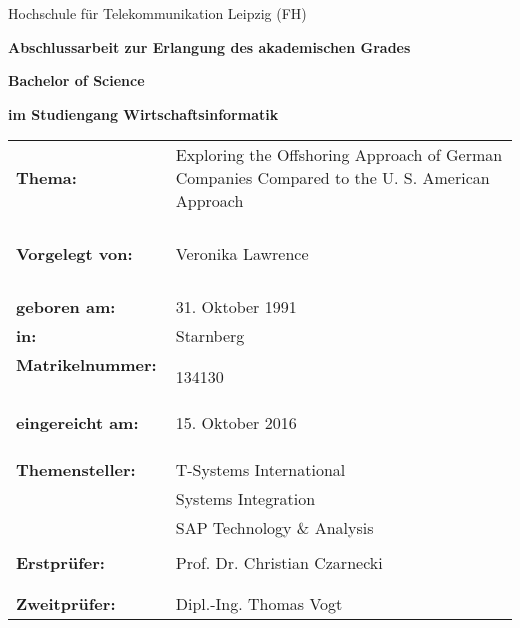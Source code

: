 
\thispagestyle{empty}
\vspace{1cm}

\begin{center}
\Large{Hochschule für Telekommunikation Leipzig (FH)}
\vspace{1.5cm}
\end{center}

\begin{center}
\large{\textbf{Abschlussarbeit zur Erlangung des akademischen Grades}}
\end{center}

\begin{center}
\vspace{-2mm}
 \Large\textbf{Bachelor of Science}
\end{center}

\begin{center}
\vspace{5mm}
\textbf{im Studiengang Wirtschaftsinformatik}
\end{center}

\vspace{2.5cm}
\begin{tabular}{p{}p{}}
\textbf{Thema:} & 
	Exploring the Offshoring Approach of German Companies Compared to the U. S. American Approach

\\
&
	
\\ &
\\ &
\\

\vspace{4,5cm}\\

\textbf{Vorgelegt von:} & Veronika Lawrence \\ 
&\\
&\\
&\\
&\\
\textbf{geboren am:} & 31. Oktober 1991 \\
\textbf{in:} & Starnberg \\
\textbf{Matrikelnummer:  } \, & {}134130\\
&\\

\textbf{eingereicht am:} & 15. Oktober 2016 \\
&\\
&\\
&\\
\textbf{Themensteller:} & T-Systems International\\
& Systems Integration\\
& SAP Technology \& Analysis\\
& \\

\textbf{Erstprüfer:} & Prof. Dr. Christian Czarnecki \\
&\\
&\\

\textbf{Zweitprüfer:} & Dipl.-Ing. Thomas Vogt \\
\end{tabular}
 